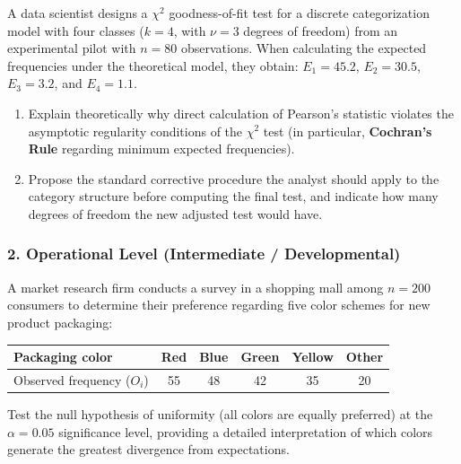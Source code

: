 \begin{problema}
	\label{prob:chi-fund-cochran}
	A data scientist designs a $\chi^2$ goodness-of-fit test for a discrete categorization model with four classes ($k = 4$, with $\nu = 3$ degrees of freedom) from an experimental pilot with $n = 80$ observations. When calculating the expected frequencies under the theoretical model, they obtain: $E_1 = 45.2$, $E_2 = 30.5$, $E_3 = 3.2$, and $E_4 = 1.1$.
	\begin{enumerate}
		\item Explain theoretically why direct calculation of Pearson's statistic violates the asymptotic regularity conditions of the $\chi^2$ test (in particular, \textbf{Cochran's Rule} regarding minimum expected frequencies).
		\item Propose the standard corrective procedure the analyst should apply to the category structure before computing the final test, and indicate how many degrees of freedom the new adjusted test would have.
	\end{enumerate}
\end{problema}

\subsubsection*{2. Operational Level (Intermediate / Developmental)}

\begin{problema}
	\label{prob:da2eb15}
	A market research firm conducts a survey in a shopping mall among $n = 200$ consumers to determine their preference regarding five color schemes for new product packaging:
	\begin{center}
		\begin{tabular}{|l|c|c|c|c|c|}\hline
			Packaging color & Red & Blue & Green & Yellow & Other \\\hline
			Observed frequency ($O_i$) & 55 & 48 & 42 & 35 & 20 \\\hline
		\end{tabular}
	\end{center}
	Test the null hypothesis of uniformity (all colors are equally preferred) at the $\alpha = 0.05$ significance level, providing a detailed interpretation of which colors generate the greatest divergence from expectations.
\end{problema}


